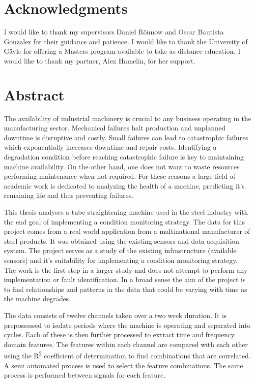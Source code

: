 \documentclass[]{article}
\begin{document}
\setmainfont{Perpetua}

\newpage
\thispagestyle{empty}
\mbox{}
\newpage
{}

\section*{Acknowledgments}
I would like to thank my supervisors Daniel Rönnow and Oscar Bautista Gonzalez for their guidance and patience. I would like to thank the University of Gävle for offering a Masters program available to take as distance education. I would like to thank my partner, Alex Hamelin, for her support.
\newpage

\section*{Abstract}
The availability of industrial machinery is crucial to any business operating in the manufacturing sector. Mechanical failures halt production and unplanned downtime is disruptive and costly. Small failures can lead to catastrophic failures which exponentially increases downtime and repair costs. Identifying a degradation condition before reaching catastrophic failure is key to maintaining machine availability. On the other hand, one does not want to waste resources performing maintenance when not required. For these reasons a large field of academic work is dedicated to analyzing the health of a machine, predicting it's remaining life and thus preventing failures.

This thesis analyses a tube straightening machine used in the steel industry with the end goal of implementing a condition monitoring strategy. The data for this project comes from a real world application from a multinational manufacturer of steel products. It was obtained using the existing sensors and data acquisition system. The project serves as a study of the existing infrastructure (available sensors) and it's suitability for implementing a condition monitoring strategy. The work is the first step in a larger study and does not attempt to perform any implementation or fault identification. In a broad sense the aim of the project is to find relationships and patterns in the data that could be varying with time as the machine degrades.

The data consists of twelve channels taken over a two week duration. It is prepossessed to isolate periods where the machine is operating and separated into cycles. Each of these is then further processed to extract time and frequency domain features. The features within each channel are compared with each other using the R\textsuperscript{2} coefficient of determination to find combinations that are correlated. A semi automated process is used to select the feature combinations. The same process is performed between signals for each feature. 
\end{document}
